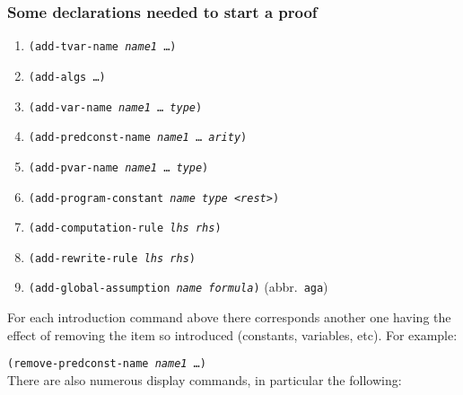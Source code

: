 \documentclass[12pt]{amsart}
\begin{document}
\subsubsection{Some declarations needed to start a proof}
\begin{enumerate}[]
\item \texttt{(add-tvar-name \textsl{name1} \dots)}%
\\
\item \texttt{(add-algs \dots)}
\\
\item \texttt{(add-var-name \textsl{name1} \dots\ \textsl{type})}%
\\
\item \texttt{(add-predconst-name \textsl{name1} \dots\ \textsl{arity})}%
\\
\item \texttt{(add-pvar-name \textsl{name1} \dots\ \textsl{type})}%
\\
\item \texttt{(add-program-constant \textsl{name} \textsl{type}
  <\textsl{rest}>)}%
\\
\item \texttt{(add-computation-rule \textsl{lhs} \textsl{rhs})}%
\\
\item \texttt{(add-rewrite-rule \textsl{lhs} \textsl{rhs})}%
\\
\item \texttt{(add-global-assumption \textsl{name} \textsl{formula})}%
  \quad \hbox{(abbr. \texttt{aga})}\\
\end{enumerate}
For each introduction command above there corresponds another one
having the effect of removing the item so introduced (constants,
variables,  etc). For example:

\texttt{(remove-predconst-name \textsl{name1} \dots)}%
\\
There are also numerous display commands, in particular the following:\\
\end{document}
